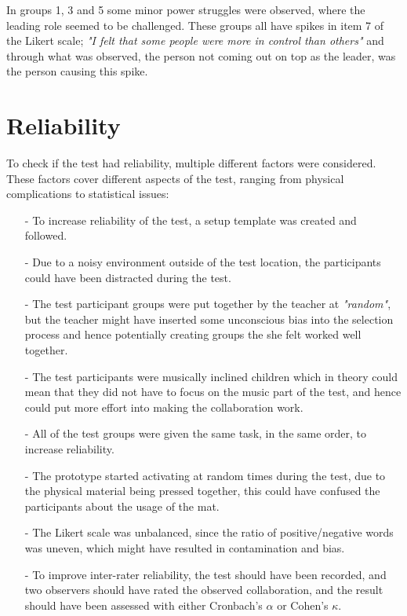             In groups 1, 3 and 5 some minor power struggles were observed, where the leading role seemed to be challenged. These groups all have spikes in item 7 of the Likert scale; \textit{"I felt that some people were more in control than others"} and through what was observed, the person not coming out on top as the leader, was the person causing this spike.

    \section{Reliability}
        To check if the test had reliability, multiple different factors were considered. These factors cover different aspects of the test, ranging from physical complications to statistical issues:\\
        \begin{itemize}
            \item[-] To increase reliability of the test, a setup template was created and followed.\\
            \item[-] Due to a noisy environment outside of the test location, the participants could have been distracted during the test.\\
            \item[-] The test participant groups were put together by the teacher at \textit{"random"}, but the teacher might have inserted some unconscious bias into the selection process and hence potentially creating groups the she felt worked well together.\\
            \item[-] The test participants were musically inclined children which in theory could mean that they did not have to focus on the music part of the test, and hence could put more effort into making the collaboration work.\\
            \item[-] All of the test groups were given the same task, in the same order, to increase reliability.\\
            \item[-] The prototype started activating at random times during the test, due to the physical material being pressed together, this could have confused the participants about the usage of the mat.\\
            \item[-] The Likert scale was unbalanced, since the ratio of positive/negative words was uneven, which might have resulted in contamination and bias\cite{unbalancedLikert}.\\
            \item[-] To improve inter-rater reliability, the test should have been recorded, and two observers should have rated the observed collaboration, and the result should have been assessed with either Cronbach's $\alpha$ or Cohen's $\kappa$.
        \end{itemize}
        
